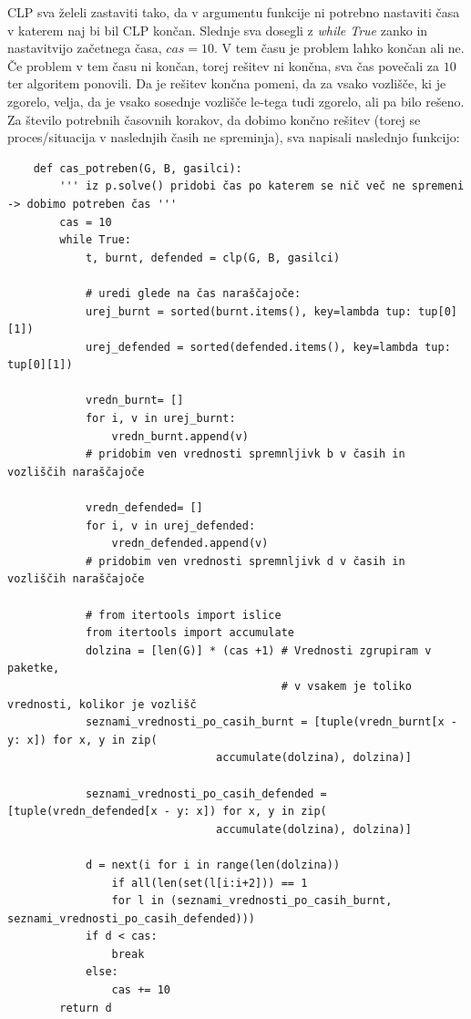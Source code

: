 \documentclass[a4paper, 12pt]{article}
\begin{document}
\noindent CLP sva želeli zastaviti tako, da v argumentu funkcije ni potrebno nastaviti časa v
katerem naj bi bil CLP končan. Slednje sva dosegli z \emph{while True} zanko in
nastavitvijo začetnega časa, $cas = 10$. V tem času je problem lahko
končan ali ne. Če problem v tem času ni končan, torej rešitev ni končna, sva čas povečali za $10$ ter
algoritem ponovili.
Da je rešitev končna pomeni, da za vsako vozlišče, ki je zgorelo, velja, da je vsako sosednje
vozlišče le-tega tudi zgorelo, ali pa bilo rešeno. \\

\noindent Za število potrebnih časovnih korakov, da dobimo končno rešitev (torej se proces/situacija v naslednjih časih ne spreminja),
sva napisali naslednjo funkcijo:

\begin{scriptsize}
\begin{verbatim}
    def cas_potreben(G, B, gasilci):
        ''' iz p.solve() pridobi čas po katerem se nič več ne spremeni -> dobimo potreben čas '''
        cas = 10
        while True:
            t, burnt, defended = clp(G, B, gasilci)

            # uredi glede na čas naraščajoče:
            urej_burnt = sorted(burnt.items(), key=lambda tup: tup[0][1])
            urej_defended = sorted(defended.items(), key=lambda tup: tup[0][1]) 

            vredn_burnt= []
            for i, v in urej_burnt:
                vredn_burnt.append(v)
            # pridobim ven vrednosti spremnljivk b v časih in vozliščih naraščajoče

            vredn_defended= []
            for i, v in urej_defended:
                vredn_defended.append(v)
            # pridobim ven vrednosti spremnljivk d v časih in vozliščih naraščajoče

            # from itertools import islice
            from itertools import accumulate
            dolzina = [len(G)] * (cas +1) # Vrednosti zgrupiram v paketke, 
                                          # v vsakem je toliko vrednosti, kolikor je vozlišč
            seznami_vrednosti_po_casih_burnt = [tuple(vredn_burnt[x - y: x]) for x, y in zip(
                                accumulate(dolzina), dolzina)]

            seznami_vrednosti_po_casih_defended = [tuple(vredn_defended[x - y: x]) for x, y in zip(
                                accumulate(dolzina), dolzina)]

            d = next(i for i in range(len(dolzina)) 
                if all(len(set(l[i:i+2])) == 1 
                for l in (seznami_vrednosti_po_casih_burnt, seznami_vrednosti_po_casih_defended)))
            if d < cas:
                break
            else:
                cas += 10
        return d\end{verbatim}
\end{scriptsize}
\end{document}

